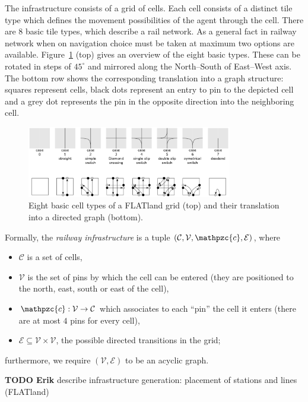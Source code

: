 \documentclass{article}
\begin{document}
The infrastructure consists of a grid of cells. Each cell consists of a distinct tile type which defines the movement possibilities of the agent through the cell. There are 8 basic tile types, which describe a rail network. As a general fact in railway network when on navigation choice must be taken at maximum two options are available.
%
Figure~\ref{fig:H1_railway_elements} (top) gives an overview of the eight basic types. These can be rotated in steps of $45^\circ$ and mirrored along the North--South of East--West axis. The bottom row shows the corresponding translation into a graph structure: squares represent cells, black dots represent an entry to pin to the depicted cell and a grey dot represents the pin in the opposite direction into the neighboring cell.
%
\begin{figure}[hbtp]
	\centering
  \includegraphics[width=0.8\textwidth]{H1_railway_elements.png}
	\caption{Eight basic cell types of a FLATland grid (top) and their translation into a directed graph (bottom).}
	\label{fig:H1_railway_elements}
\end{figure}
%
Formally, the \emph{railway infrastructure} is a tuple  $(\mathcal{C}, \mathcal{V}, \mathpzc{c}, \mathcal{E})$, where
\begin{itemize}
    \item $\mathcal{C}$ is a set of cells,
    \item $\mathcal{V}$ is the set of pins by which the cell can be entered (they are positioned to the north, east, south or east of the cell),
    \item $\mathpzc{c}: \mathcal{V} \to \mathcal{C}$ which associates to each ``pin'' the cell it enters (there are at most $4$ pins for every cell),
    \item $\mathcal{E} \subseteq \mathcal{V} \times \mathcal{V}$, the possible directed transitions in the grid;
\end{itemize}
furthermore, we require $(\mathcal{V},\mathcal{E})$ to be an acyclic graph.



\begin{mdframed}
{\bf TODO Erik} describe infrastructure generation: placement of stations and lines (FLATland)
\end{mdframed}
\end{document}
